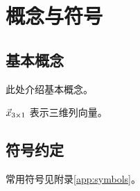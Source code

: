 \chapter{概念与符号}
\label{chap:chapter3}

\section{基本概念}
此处介绍基本概念。
\begin{definition}[向量]
\(\vec{x}_{3\times 1}\) 表示三维列向量。
\end{definition}

\section{符号约定}
常用符号见附录\ref{app:symbols}。
